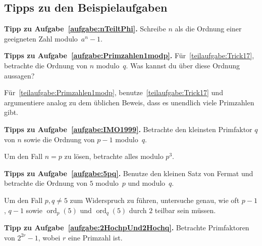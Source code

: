 \subsection*{Tipps zu den Beispielaufgaben}

\textbf{Tipp zu Aufgabe~\ref{aufgabe:nTeiltPhi}.} Schreibe $n$ als die Ordnung einer geeigneten Zahl modulo~$a^n-1$.

\textbf{Tipps zu Aufgabe~\ref{aufgabe:Primzahlen1modp}.} Für~\ref{teilaufgabe:Trick17}, betrachte die Ordnung von $n$ modulo~$q$. Was kannst du über diese Ordnung aussagen?

Für~\ref{teilaufgabe:Primzahlen1modp}, benutze~\ref{teilaufgabe:Trick17} und argumentiere analog zu dem üblichen Beweis, dass es unendlich viele Primzahlen gibt.

\textbf{Tipps zu Aufgabe~\ref{aufgabe:IMO1999}.} Betrachte den kleinsten Primfaktor $q$ von $n$ sowie die Ordnung von $p-1$ modulo~$q$.

Um den Fall $n=p$ zu lösen, betrachte alles modulo $p^3$.

\textbf{Tipps zu Aufgabe~\ref{aufgabe:5pq}.} Benutze den kleinen Satz von Fermat und betrachte die Ordnung von $5$ modulo~$p$ und modulo~$q$.

Um den Fall $p,q\neq 5$ zum Widerspruch zu führen, untersuche genau, wie oft $p-1$, $q-1$ sowie $\operatorname{ord}_p(5)$ und $\operatorname{ord}_q(5)$ durch $2$ teilbar sein müssen.


\textbf{Tipp zu Aufgabe~\ref{aufgabe:2HochpUnd2Hochq}.} Betrachte Primfaktoren von $2^{2r}-1$, wobei $r$ eine Primzahl ist.
